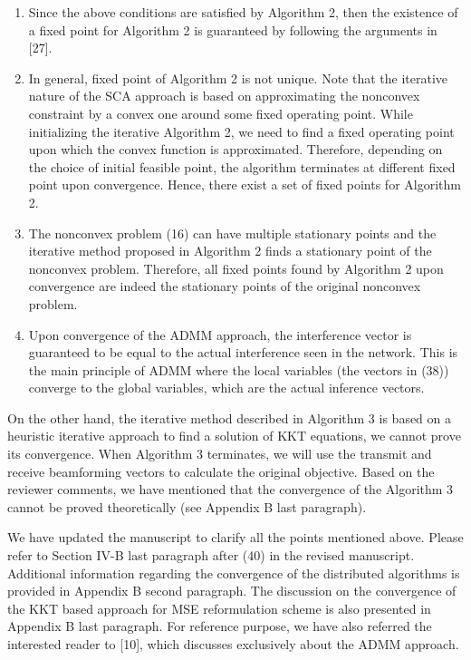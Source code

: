 \begin{enumerate}
\begin{enumerate}
	\item Since the above conditions are satisfied by Algorithm 2, then the existence of a fixed point for Algorithm 2 is guaranteed by following the arguments in [27].
	
	\item In general, fixed point of Algorithm 2 is not unique. Note that the iterative nature of the \ac{SCA} approach is based on approximating the nonconvex constraint by a convex one around some fixed operating point. While initializing the iterative Algorithm 2, we need to find a fixed operating point upon which the convex function is approximated. Therefore, depending on the choice of initial feasible point, the algorithm terminates at different fixed point upon convergence. Hence, there exist a set of fixed points for Algorithm 2.
	
	\item The nonconvex problem (16) can have multiple stationary points and the iterative method proposed in Algorithm 2 finds a stationary point of the nonconvex problem. Therefore, all fixed points found by Algorithm 2 upon convergence are indeed the stationary points of the original nonconvex problem.
		
	\item Upon convergence of the \ac{ADMM} approach, the interference vector is guaranteed to be equal to the actual interference seen in the network. This is the main principle of \ac{ADMM} where the local variables (the vectors in (38)) converge to the global variables, which are the actual inference vectors.
	
\end{enumerate}

On the other hand, the iterative method described in Algorithm 3 is based on a heuristic iterative approach to find a solution of \ac{KKT} equations, we cannot prove its convergence. When Algorithm 3 terminates, we will use the transmit and receive beamforming vectors to calculate the original objective. Based on the reviewer comments, we have mentioned that the convergence of the Algorithm 3 cannot be proved theoretically (see Appendix B last paragraph).

We have updated the manuscript to clarify all the points mentioned above. Please refer to Section IV-B last paragraph after (40) in the revised manuscript. Additional information regarding the convergence of the distributed algorithms is provided in Appendix B second paragraph. The discussion on the convergence of the KKT based approach for MSE reformulation scheme is also presented in Appendix B last paragraph. For reference purpose, we have also referred the interested reader to [10], which discusses exclusively about the \ac{ADMM} approach.


\end{enumerate}
